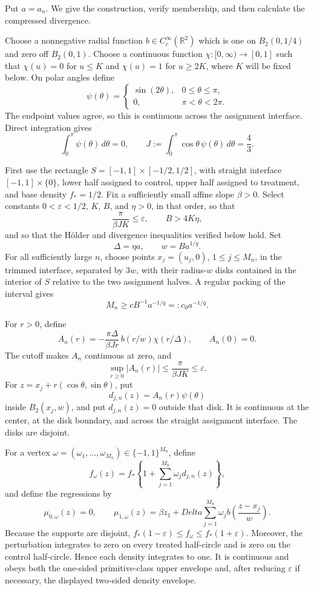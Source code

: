 Put \(a=a_n\).  We give the construction, verify membership, and then calculate the compressed divergence.

Choose a nonnegative radial function \(b\in C_c^\infty(\mathbb R^2)\) which is one on \(B_2(0,1/4)\) and zero off \(B_2(0,1)\).  Choose a continuous function \(\chi:[0,\infty)\to[0,1]\) such that \(\chi(u)=0\) for \(u\leq K\) and \(\chi(u)=1\) for \(u\geq2K\), where \(K\) will be fixed below.  On polar angles define
\[
 \psi(\theta)=
 \begin{cases}
 \sin(2\theta),&0\leq\theta\leq\pi,\\
 0,&\pi<\theta<2\pi.
 \end{cases}
\]
The endpoint values agree, so this is continuous across the assignment interface.  Direct integration gives
\[
 \int_0^\pi\psi(\theta)\,d\theta=0,
 \qquad
 J:=\int_0^\pi\cos\theta\,\psi(\theta)\,d\theta=\frac43.
\]

First use the rectangle \(S=[-1,1]\times[-1/2,1/2]\), with straight interface \([-1,1]\times\{0\}\), lower half assigned to control, upper half assigned to treatment, and base density \(f_*=1/2\).  Fix a sufficiently small affine slope \(\beta>0\).  Select constants \(0<\varepsilon<1/2\), \(K\), \(B\), and \(\eta>0\), in that order, so that
\[
 \frac{\pi}{\beta J K}\leq\varepsilon,
 \qquad B>4K\eta,
\]
and so that the H\"older and divergence inequalities verified below hold.  Set
\[
 \Delta=\eta a,
 \qquad w=Ba^{1/q}.
\]
For all sufficiently large \(n\), choose points \(x_j=(u_j,0)\), \(1\leq j\leq M_n\), in the trimmed interface, separated by \(3w\), with their radius-\(w\) disks contained in the interior of \(S\) relative to the two assignment halves.  A regular packing of the interval gives
\[
 M_n\geq cB^{-1}a^{-1/q}=:c_0a^{-1/q}.
\]

For \(r>0\), define
\[
 A_n(r)=-\frac{\pi\Delta}{\beta Jr}\,b(r/w)\chi(r/\Delta),
 \qquad A_n(0)=0.
\]
The cutoff makes \(A_n\) continuous at zero, and
\[
 \sup_{r\geq0}|A_n(r)|
 \leq\frac{\pi}{\beta JK}\leq\varepsilon.
\]
For \(z=x_j+r(\cos\theta,\sin\theta)\), put
\[
 d_{j,n}(z)=A_n(r)\psi(\theta)
\]
inside \(B_2(x_j,w)\), and put \(d_{j,n}(z)=0\) outside that disk.  It is continuous at the center, at the disk boundary, and across the straight assignment interface.  The disks are disjoint.

For a vertex \(\omega=(\omega_1,\ldots,\omega_{M_n})\in\{-1,1\}^{M_n}\), define
\[
 f_\omega(z)=f_*\left\{1+\sum_{j=1}^{M_n}\omega_jd_{j,n}(z)\right\},
\]
and define the regressions by
\[
 \mu_{0,\omega}(z)=0,
 \qquad
 \mu_{1,\omega}(z)=\beta z_1+Delta\sum_{j=1}^{M_n}\omega_j b\!\left(\frac{z-x_j}{w}\right).
\]
Because the supports are disjoint, \(f_*(1-\varepsilon)\leq f_\omega\leq f_*(1+\varepsilon)\).  Moreover, the perturbation integrates to zero on every treated half-circle and is zero on the control half-circle.  Hence each density integrates to one.  It is continuous and obeys both the one-sided primitive-class upper envelope and, after reducing \(\varepsilon\) if necessary, the displayed two-sided density envelope.

